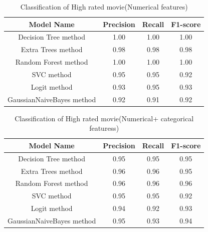 \documentclass{article}%
\begin{document}
\begin{table}[tb]
\caption{Classification of High rated movie(Numerical features)}
\label{tab:Classification_of_High_rated_movie}
\begin{center}
\footnotesize
\begin{tabular}{|c|c|c|c|} \hline
\textbf{Model Name}& \textbf{Precision}& \textbf{Recall} & \textbf{F1-score }   \\ \hline \hline
Decision Tree method &	1.00	& 1.00 &	1.00\\ \hline
Extra Trees method &	0.98	& 0.98 &	0.98\\ \hline
Random Forest method &	1.00	&1.00&	1.00\\ \hline
SVC method &	0.95	& 0.95 &	0.92\\ \hline
Logit method&	0.93&	0.95&	0.93\\ \hline
GaussianNaiveBayes method&	0.92	&0.91	&0.92\\ \hline

\end{tabular}
\end{center}
\end{table}



\begin{table}[tb]
\caption{Classification of High rated movie(Numerical+ categorical featuress)}
\label{tab:Classification_of_High_rated_movie_NC}
\begin{center}
\footnotesize
\begin{tabular}{|c|c|c|c|} \hline
\textbf{Model Name}& \textbf{Precision}& \textbf{Recall} & \textbf{F1-score }   \\ \hline \hline
Decision Tree method & 0.95	 & 0.95	& 0.95\\ \hline
Extra Trees method & 0.96 &	0.96 &	0.95\\ \hline
Random Forest method & 0.96	& 0.96 &	0.96\\ \hline
SVC method & 0.95 &	0.95	&0.92\\ \hline
Logit method& 0.94	& 0.92 &	0.93\\ \hline
GaussianNaiveBayes method & 0.95 &	0.93 &	0.94\\ \hline

\end{tabular}
\end{center}
\end{table}
\end{document}
